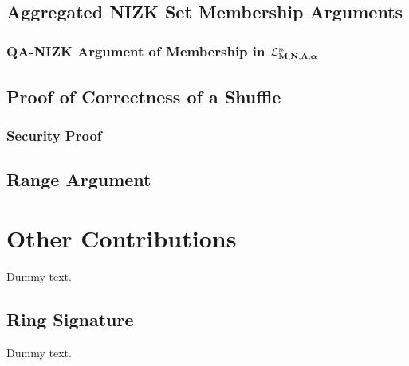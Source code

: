     \section{Aggregated NIZK Set Membership Arguments}

        

        \subsection{QA-NIZK Argument of Membership in $\mathcal{L}_{\mathbf{{M}},\mathbf{{N}},\mathbf{{\Lambda}},{\boldsymbol \alpha}}^n$} \label{sec:bin-lan-constr}

            

    \section{Proof of Correctness of a Shuffle}

        

        \subsection{Security Proof}

            

    \section{Range Argument}

        

\chapter{Other Contributions}

    Dummy text.

    \section{Ring Signature}

Dummy text.
